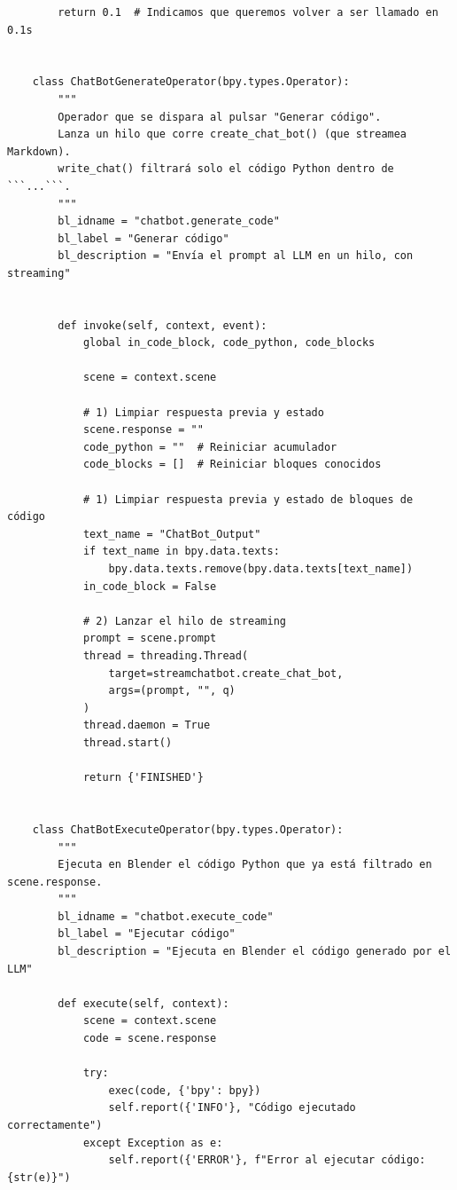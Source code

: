 \begin{verbatim}
        return 0.1  # Indicamos que queremos volver a ser llamado en 0.1s
    
    
    class ChatBotGenerateOperator(bpy.types.Operator):
        """
        Operador que se dispara al pulsar "Generar código".
        Lanza un hilo que corre create_chat_bot() (que streamea Markdown).
        write_chat() filtrará solo el código Python dentro de ```...```.
        """
        bl_idname = "chatbot.generate_code"
        bl_label = "Generar código"
        bl_description = "Envía el prompt al LLM en un hilo, con streaming"
    
    
        def invoke(self, context, event):
            global in_code_block, code_python, code_blocks
            
            scene = context.scene
            
            # 1) Limpiar respuesta previa y estado
            scene.response = ""
            code_python = ""  # Reiniciar acumulador
            code_blocks = []  # Reiniciar bloques conocidos
    
            # 1) Limpiar respuesta previa y estado de bloques de código
            text_name = "ChatBot_Output"
            if text_name in bpy.data.texts:
                bpy.data.texts.remove(bpy.data.texts[text_name])
            in_code_block = False
    
            # 2) Lanzar el hilo de streaming
            prompt = scene.prompt
            thread = threading.Thread(
                target=streamchatbot.create_chat_bot,
                args=(prompt, "", q)
            )
            thread.daemon = True
            thread.start()
    
            return {'FINISHED'}
    
    
    class ChatBotExecuteOperator(bpy.types.Operator):
        """
        Ejecuta en Blender el código Python que ya está filtrado en scene.response.
        """
        bl_idname = "chatbot.execute_code"
        bl_label = "Ejecutar código"
        bl_description = "Ejecuta en Blender el código generado por el LLM"
    
        def execute(self, context):
            scene = context.scene
            code = scene.response
    
            try:
                exec(code, {'bpy': bpy})
                self.report({'INFO'}, "Código ejecutado correctamente")
            except Exception as e:
                self.report({'ERROR'}, f"Error al ejecutar código: {str(e)}")
    

\end{verbatim}
